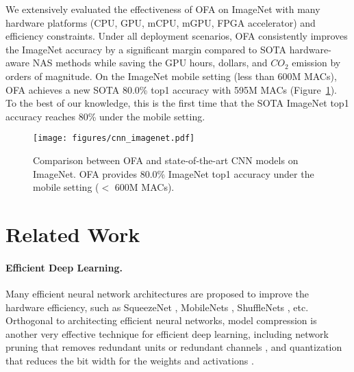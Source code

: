 \documentclass{article} \usepackage{iclr2020_conference,times}
\newcommand{\myparagraph}[1]{\vspace{-3pt}\paragraph{#1}}
\begin{document}
We extensively evaluated the effectiveness of OFA on ImageNet with many hardware platforms (CPU, GPU, mCPU, mGPU, FPGA accelerator) and efficiency constraints. Under all deployment scenarios, OFA consistently improves the ImageNet accuracy by a significant margin compared to SOTA hardware-aware NAS methods while saving the GPU hours, dollars, and $CO_2$ emission by orders of magnitude. On the ImageNet mobile setting (less than 600M MACs), OFA achieves a new SOTA 80.0\% top1 accuracy with 595M MACs (Figure~\ref{fig:cnn_imagenet}). To the best of our knowledge, this is the first time that the SOTA ImageNet top1 accuracy reaches 80\% under the mobile setting.

\begin{figure}[t]
    \vspace{-20pt}
    \centering
    \texttt{[image: figures/cnn\_imagenet.pdf]}
    \caption{Comparison between OFA and state-of-the-art CNN models on ImageNet. OFA provides 80.0\% ImageNet top1 accuracy under the mobile setting ($<$ 600M MACs).}\label{fig:cnn_imagenet}
\end{figure}
 
\section{Related Work}
\myparagraph{Efficient Deep Learning.} 
Many efficient neural network architectures are proposed to improve the hardware efficiency, such as SqueezeNet \citep{iandola2016squeezenet}, MobileNets \citep{howard2017mobilenets,sandler2018mobilenetv2}, ShuffleNets \citep{ma2018shufflenet,zhang2018shufflenet}, etc. 
Orthogonal to architecting efficient neural networks, model compression \citep{han2016deep} is another very effective technique for efficient deep learning,
including network pruning that removes redundant units \citep{han2015learning} or redundant channels \citep{he2018amc,liu2017learning}, and quantization that reduces the bit width for the weights and activations \citep{han2016deep,courbariaux2015binaryconnect,zhu2016trained}. 
\end{document}
